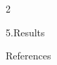 \documentclass[final]{beamer}
\begin{document}
\begin{frame}[t]
\begin{multicols}{2}
\begin{block}{5.\enspace Results}
\end{block}


\begin{block}{References}
{\tiny\printbibliography[heading=none]}
\end{block}


\end{multicols}
\end{frame}
\end{document}
